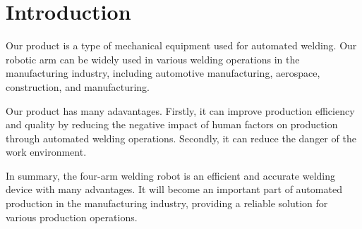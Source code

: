 \section{Introduction}
\FloatBarrier %

Our product is a type of mechanical equipment used for automated welding. Our robotic arm can be widely used in various welding operations in the manufacturing industry, including automotive manufacturing, aerospace, construction, and manufacturing.

Our product has many adavantages. Firstly, it can improve production efficiency and quality by reducing the negative impact of human factors on production through automated welding operations. Secondly, it can reduce the danger of the work environment. 

In summary, the four-arm welding robot is an efficient and accurate welding device with many advantages. It will become an important part of automated production in the manufacturing industry, providing a reliable solution for various production operations.

